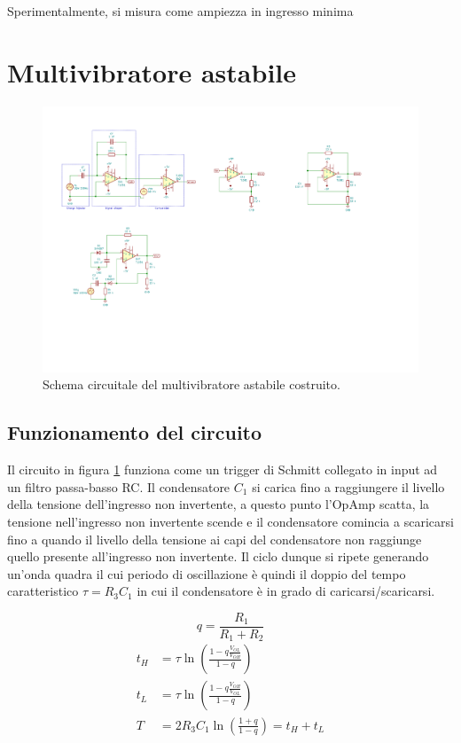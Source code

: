 \documentclass[10pt,a4paper]{article}
\begin{document}
Sperimentalmente, si misura come ampiezza in ingresso minima

\section{Multivibratore astabile}

\begin{figure}[htbp]
    \centering
	\includegraphics[scale=1.5]{astable}
    \caption{Schema circuitale del multivibratore astabile costruito.
    \label{fig: astableschm}}
\end{figure}

\subsection{Funzionamento del circuito}
Il circuito in figura \ref{fig: astableschm} funziona come un trigger di
Schmitt collegato in input ad un filtro passa-basso RC. Il condensatore $C_1$ si
carica fino a raggiungere il livello della tensione dell’ingresso non
invertente, a questo punto l’OpAmp scatta, la tensione nell’ingresso non invertente
scende e il condensatore comincia a scaricarsi fino a quando il livello della
tensione ai capi del condensatore non raggiunge quello presente all’ingresso
non invertente.
Il ciclo dunque si ripete generando un'onda quadra il cui periodo di
oscillazione è quindi il doppio del tempo caratteristico $\tau = R_3 C_1$ in
cui il condensatore è in grado di caricarsi/scaricarsi.

\[
q = \frac{R_1}{R_1 + R_2}
\]
\begin{align}
t_H &= \tau \ln\left(\frac{1 - q\frac{V_{OL}}{V_{OH}}}{1-q}\right) \\
t_L &= \tau \ln\left(\frac{1 - q\frac{V_{OH}}{V_{OL}}}{1-q}\right) \\
T &= 2 R_3 C_1 \ln\left(\frac{1 + q}{1 - q}\right) = t_H + t_L
\end{align}
\end{document}
